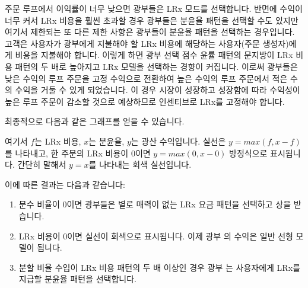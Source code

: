 \documentclass{article}
\makeatletter
\newenvironment{figurehere}
{\def\@captype{figure}}
\makeatother
\begin{document}
\begin{multicols}{2}
\begin{center}
\begin{figurehere}
		\label{fig:marginsplit}
	\end{figurehere}
\end{center}

\indent 주문 루프에서 이익률이 너무 낮으면 광부들은 LRx 모드를 선택합니다. 반면에 수익이 너무 커서 LRx 비용을 훨씬 초과할 경우 광부들은 분윤율 패턴을 선택할 수도 있지만 여기서 제한되는 또 다른 제한 사항은 광부들이 분윤율 패턴을 선택하는 경우입니다. 고객은 사용자가 광부에게 지불해야 할 LRx 비용에 해당하는 사용자(주문 생성자)에게 비용을 지불해야 합니다. 이렇게 하면 광부 선택 점수 윤률 패턴의 문지방이 LRx 비용 패턴의 두 배로 높아지고 LRx 모델을 선택하는 경향이 커집니다. 이로써 광부들은 낮은 수익의 루프 주문을 고정 수익으로 전환하여 높은 수익의 루프 주문에서 적은 수의 수익을 거둘 수 있게 되었습니다. 이 경우 시장이 성장하고 성장함에 따라 수익성이 높은 루프 주문이 감소할 것으로 예상하므로 인센티브로 LRx를 고정해야 합니다.


\indent 최종적으로 다음과 같은 그래프를 얻을 수 있습니다.


\begin{center}
	\begin{figurehere}
		\centering
\label{fig:feemodel}
\end{figurehere}
\end{center}
		
\indent 여기서 $f$는 LRx 비용, $x$는 분윤율, $y$는 광산 수익입니다. 실선은 $y=max(f, x-f)$를 나타내고, 한 주문의 LRx 비용이 $0$이면 $y=max(0, x - 0)$ 방정식으로 표시됩니다. 간단히 말해서 $y = x$를 나타내는 회색 실선입니다.


\indent 이에 따른 결과는 다음과 같습니다:
\begin{enumerate}
      \item 분수 비율이 0이면 광부들은 별로 매력이 없는 LRx 요금 패턴을 선택하고 상을 받습니다.
      \item LRx 비용이 0이면 실선이 회색으로 표시됩니다. 이제 광부 의 수익은 일반 선형 모델이 됩니다.
      \item 분할 비율 수입이 LRx 비용 패턴의 두 배 이상인 경우 광부 는 사용자에게 LRx를 지급할 분윤율 패턴을 선택합니다.
\end{enumerate}


\end{multicols}
\end{document}

